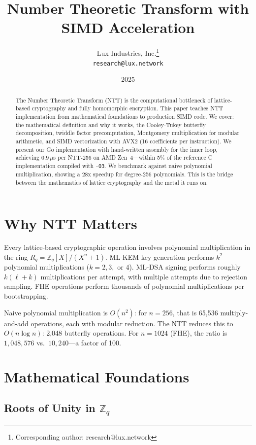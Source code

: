 \documentclass[11pt,a4paper]{article}
\title{Number Theoretic Transform with SIMD Acceleration}
\author{
Lux Industries, Inc.\thanks{Corresponding author: research@lux.network}\\
\texttt{research@lux.network}
}
\date{2025}
\begin{document}
\luxcoverpage

\begin{abstract}
The Number Theoretic Transform (NTT) is the computational bottleneck of lattice-based
cryptography and fully homomorphic encryption. This paper teaches NTT implementation from
mathematical foundations to production SIMD code. We cover: the mathematical definition
and why it works, the Cooley-Tukey butterfly decomposition, twiddle factor precomputation,
Montgomery multiplication for modular arithmetic, and SIMD vectorization with AVX2 (16
coefficients per instruction). We present our Go implementation with hand-written assembly
for the inner loop, achieving 0.9\,$\mu$s per NTT-256 on AMD Zen~4---within 5\% of the
reference C implementation compiled with \texttt{-O3}. We benchmark against naive polynomial
multiplication, showing a 28x speedup for degree-256 polynomials. This is the bridge between
the mathematics of lattice cryptography and the metal it runs on.
\end{abstract}

\tableofcontents
\newpage

\section{Why NTT Matters}

Every lattice-based cryptographic operation involves polynomial multiplication in the ring
$R_q = \mathbb{Z}_q[X]/(X^n + 1)$. ML-KEM key generation performs $k^2$ polynomial
multiplications ($k = 2, 3,$ or $4$). ML-DSA signing performs roughly $k(\ell + k)$
multiplications per attempt, with multiple attempts due to rejection sampling. FHE
operations perform thousands of polynomial multiplications per bootstrapping.

Naive polynomial multiplication is $O(n^2)$: for $n = 256$, that is 65,536 multiply-and-add
operations, each with modular reduction. The NTT reduces this to $O(n \log n)$: 2,048
butterfly operations. For $n = 1024$ (FHE), the ratio is $1{,}048{,}576$ vs.\ $10{,}240$---a
factor of 100.

\section{Mathematical Foundations}

\subsection{Roots of Unity in $\mathbb{Z}_q$}
\end{document}
